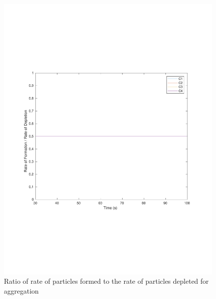 \documentclass[preprint,11pt,authoryear]{elsarticle}
\begin{document}
\begin{figure}[H]
	\centering
	\includegraphics[scale=0.5]{rslts_PBM_2mm_validation.pdf}
	\caption{Ratio of rate of particles formed to the rate of particles depleted for aggregation}
	\label{fig:pbm_model_validation_ratio}
\end{figure}
\end{document}
